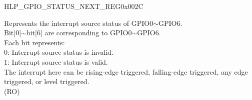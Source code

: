 \begin{register}{H}{LP\_GPIO\_STATUS\_NEXT\_REG}{0x002C}\label{regdesc:LPGPIOSTATUSNEXTREG}
%
%
\regnewline%
\begin{regdesc}\begin{reglist}
\label{fielddesc:LPGPIOSTATUSINTERRUPTNEXT}\item [LP\_GPIO\_STATUS\_INTERRUPT\_NEXT] Represents the interrupt source status of GPIO0$\sim$GPIO6.\\
Bit[0]$\sim$bit[6] are corresponding to GPIO0$\sim$GPIO6.\\
Each bit represents:\\
0: Interrupt source status is invalid.\\
1: Interrupt source status is valid.\\ 
The interrupt here can be rising-edge triggered, falling-edge triggered, any edge triggered, or level triggered.\\ (RO)
\end{reglist}\end{regdesc}
\end{register}


